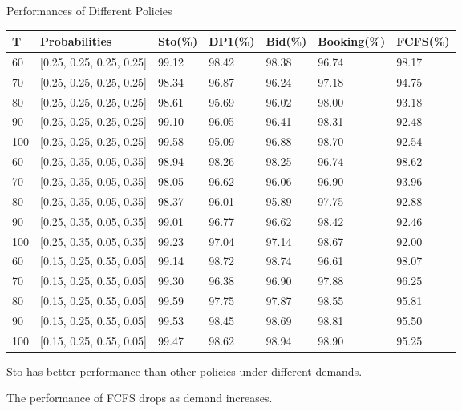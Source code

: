     \begin{frame}{Performances of Different Policies}
        \scriptsize
        \begin{table}[ht]
          \centering
          \begin{tabular}{|l|l|l|l|l|l|l|}
          \hline
           T & Probabilities & Sto(\%) & DP1(\%) & Bid(\%) & Booking(\%) & FCFS(\%) \\
          \hline
          60  & [0.25, 0.25, 0.25, 0.25]  & 99.12 & 98.42 & 98.38 & 96.74 & 98.17 \\
          70  & [0.25, 0.25, 0.25, 0.25]  & 98.34 & 96.87 & 96.24 & 97.18 & 94.75 \\
          80  & [0.25, 0.25, 0.25, 0.25]  & 98.61 & 95.69 & 96.02 & 98.00 & 93.18 \\
          90  & [0.25, 0.25, 0.25, 0.25]  & 99.10 & 96.05 & 96.41 & 98.31 & 92.48 \\
          100 & [0.25, 0.25, 0.25, 0.25]  & 99.58 & 95.09 & 96.88 & 98.70 & 92.54 \\
          \hline
          60  & [0.25, 0.35, 0.05, 0.35]  & 98.94 & 98.26 & 98.25 & 96.74 & 98.62 \\
          70  & [0.25, 0.35, 0.05, 0.35]  & 98.05 & 96.62 & 96.06 & 96.90 & 93.96 \\
          80  & [0.25, 0.35, 0.05, 0.35]  & 98.37 & 96.01 & 95.89 & 97.75 & 92.88 \\
          90  & [0.25, 0.35, 0.05, 0.35]  & 99.01 & 96.77 & 96.62 & 98.42 & 92.46 \\
          100 & [0.25, 0.35, 0.05, 0.35]  & 99.23 & 97.04 & 97.14 & 98.67 & 92.00 \\
          \hline
          60  & [0.15, 0.25, 0.55, 0.05]  & 99.14 & 98.72 & 98.74 & 96.61 & 98.07 \\
          70  & [0.15, 0.25, 0.55, 0.05]  & 99.30 & 96.38 & 96.90 & 97.88 & 96.25 \\
          80  & [0.15, 0.25, 0.55, 0.05]  & 99.59 & 97.75 & 97.87 & 98.55 & 95.81 \\
          90  & [0.15, 0.25, 0.55, 0.05]  & 99.53 & 98.45 & 98.69 & 98.81 & 95.50 \\
          100 & [0.15, 0.25, 0.55, 0.05]  & 99.47 & 98.62 & 98.94 & 98.90 & 95.25 \\
          \hline
          \end{tabular}
        \end{table}
        Sto has better performance than other policies under different demands.
        
        The performance of FCFS drops as demand increases. 
    \end{frame}
      
